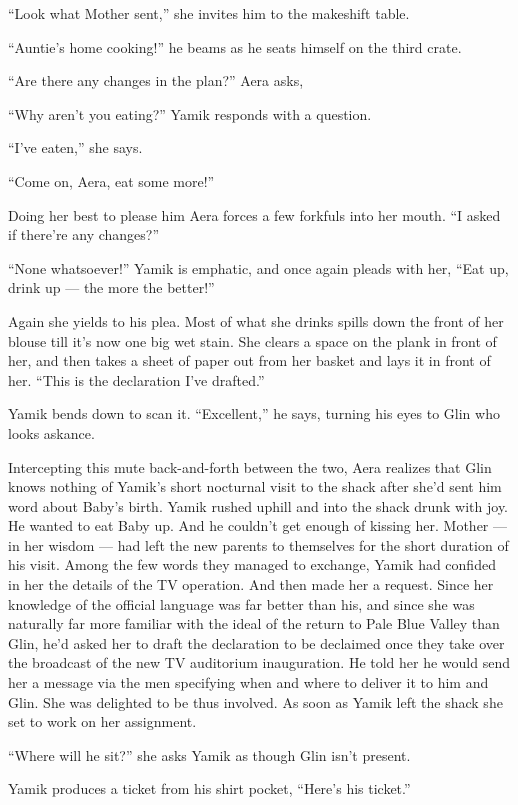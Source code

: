 \documentclass[twoside,11pt,openany]{book}
\begin{document}
``Look what Mother sent,'' she invites him to the makeshift table.

``Auntie's home cooking!'' he beams as he seats himself on the third crate.

``Are there any changes in the plan?'' Aera asks,

``Why aren't you eating?'' Yamik responds with a question.

``I've eaten,'' she says.

``Come on, Aera, eat some more!''

Doing her best to please him Aera forces a few forkfuls into her mouth. ``I asked if there're any
changes?''

``None whatsoever!'' Yamik is emphatic, and once again pleads with her, ``Eat up, drink up --- the more the better!''

Again she yields to his plea. Most of what she drinks spills down the front of her blouse till it's now one big wet
stain. She clears a space on the plank in front of her, and then takes a sheet of paper out from her basket and lays it
in front of her. ``This is the declaration I've drafted.''

Yamik bends down to scan it. ``Excellent,'' he says, turning his eyes to Glin who looks
askance.

Intercepting this mute back-and-forth between the two, Aera realizes that Glin knows nothing of Yamik's short nocturnal
visit to the shack after she'd sent him word about Baby's birth. Yamik rushed uphill and into the shack  drunk with
joy. He wanted to eat Baby up. And he{ }couldn't get enough of kissing her.  Mother --- in her wisdom
--- had left the new parents to themselves for the short duration of his visit. Among the few words they managed to
exchange, Yamik had confided in her the details of the TV operation. And then made her a request. Since her knowledge
of the official language was far better than his, and since she was naturally far more familiar with the ideal of the
return to  Pale Blue Valley than Glin, he'd asked her to draft the declaration to be declaimed once they take over
the broadcast of the new TV auditorium inauguration. He told her he would send her a message via the men specifying when and
where to deliver it to him and Glin. She was delighted to be thus involved. As soon as Yamik left the shack she set to
work on her assignment.

``Where will he sit?'' she asks Yamik as though Glin isn't present.

Yamik produces a ticket from his shirt pocket, ``Here's his ticket.''
\end{document}
